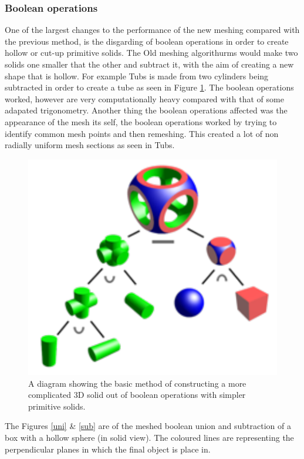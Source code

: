 \documentclass[12pt,a4paper]{article}
\begin{document}
\subsubsection{Boolean operations}
\label{bool}
One of the largest changes to the performance of the new meshing compared with the previous method, is the disgarding of boolean operations in order to create hollow or cut-up primitive solids. The Old meshing algorithurms would make two solids one smaller that the other and subtract it, with the aim of creating a new shape that is hollow. For example Tubs is made from two cylinders being subtracted in order to create a tube as seen in Figure \ref{tubspic}. The boolean operations worked, however are very computationally heavy compared with that of some adapated trigonometry. Another thing the boolean operations affected was the appearance of the mesh its self, the boolean operations worked by trying to identify common mesh points and then remeshing. This created a lot of non radially uniform mesh sections as seen in Tubs.

\begin{figure}[h!]
\centering
\includegraphics[scale=1]{Images//Booleans//Boolean.pdf}
\caption[width=\columnwidth]{A diagram showing the basic method of constructing a more complicated 3D solid out of boolean operations with simpler primitive solids.}
\label{tubspic}
\end{figure}

The Figures \ref{uni} \& \ref{sub} are of the meshed boolean union and subtraction of a box with a hollow sphere (in solid view). The coloured lines are representing the perpendicular planes in which the final object is place in. 
\end{document}

